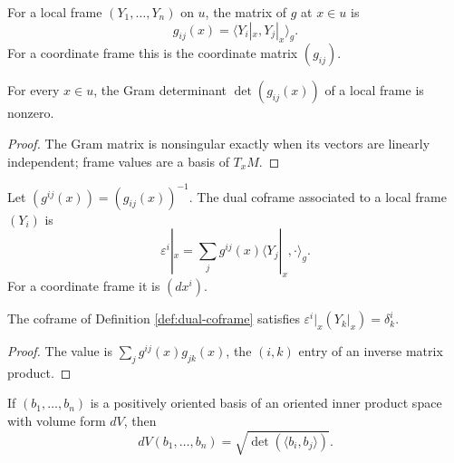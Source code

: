\begin{definition}
\label{def:frame-matrix}
\leanok
For a local frame $(Y_1,\ldots,Y_n)$ on $u$, the matrix of $g$ at $x\in u$ is
\[
g_{ij}(x)=\langle Y_i|_x,Y_j|_x\rangle_g.
\]
For a coordinate frame this is the coordinate matrix $(g_{ij})$.
\end{definition}

\begin{lemma}
\label{lem:frame-matrix-nonsingular}
\leanok
{}
For every $x\in u$, the Gram determinant $\det(g_{ij}(x))$ of a local frame is nonzero.
\end{lemma}

\begin{proof}
\leanok
{}
\sketch The Gram matrix is nonsingular exactly when its vectors are linearly independent; frame values are a basis of $T_xM$.
\end{proof}

\begin{definition}
\label{def:dual-coframe}
\leanok
{}
Let $(g^{ij}(x))=(g_{ij}(x))^{-1}$. The dual coframe associated to a local frame $(Y_i)$ is
\[
\varepsilon^i|_x=\sum_j g^{ij}(x)\langle Y_j|_x,\cdot\rangle_g.
\]
For a coordinate frame it is $(dx^i)$.
\end{definition}

\begin{lemma}
\label{lem:dual-coframe-duality}
\leanok
{}
The coframe of Definition \ref{def:dual-coframe} satisfies $\varepsilon^i|_x(Y_k|_x)=\delta^i_k$.
\end{lemma}

\begin{proof}
\leanok
{}
\sketch The value is $\sum_jg^{ij}(x)g_{jk}(x)$, the $(i,k)$ entry of an inverse matrix product.
\end{proof}

\begin{lemma}
\label{lem:volume-form-gram-determinant}
\leanok
{}
If $(b_1,\ldots,b_n)$ is a positively oriented basis of an oriented inner product space with volume form $dV$, then
\[
dV(b_1,\ldots,b_n)=\sqrt{\det(\langle b_i,b_j\rangle)}.
\]
\end{lemma}


